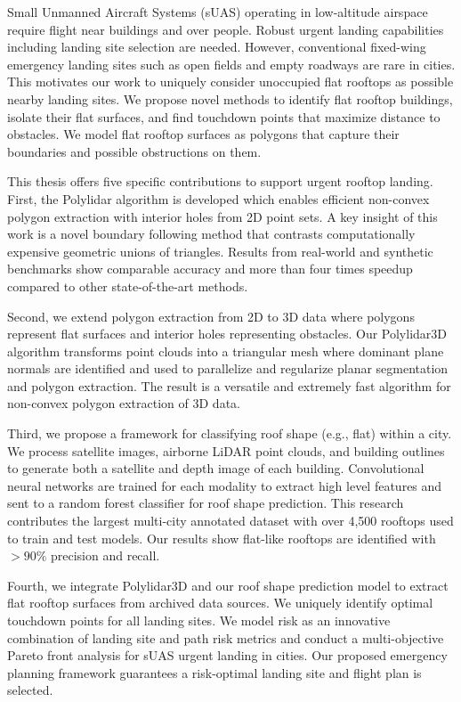Small Unmanned Aircraft Systems (sUAS) operating in low-altitude airspace require flight near buildings and over people. Robust urgent landing capabilities including landing site selection are needed. However, conventional fixed-wing emergency landing sites such as open fields and empty roadways are rare in cities. This motivates our work to uniquely consider unoccupied flat rooftops as possible nearby landing sites. We propose novel methods to identify flat rooftop buildings, isolate their flat surfaces, and find touchdown points that maximize distance to obstacles. We model flat rooftop surfaces as polygons that capture their boundaries and possible obstructions on them.

This thesis offers five specific contributions to support urgent rooftop landing. First, the Polylidar algorithm is developed which enables efficient non-convex polygon extraction with interior holes from 2D point sets.  A key insight of this work is a novel boundary following method that contrasts computationally expensive geometric unions of triangles. Results from real-world and synthetic benchmarks show comparable accuracy and more than four times speedup compared to other state-of-the-art methods. 

Second, we extend polygon extraction from 2D to 3D data where polygons represent flat surfaces and interior holes representing obstacles. Our Polylidar3D algorithm transforms point clouds into a triangular mesh where dominant plane normals are identified and used to parallelize and regularize planar segmentation and polygon extraction. The result is a versatile and extremely fast algorithm for non-convex polygon extraction of 3D data.

Third, we propose a framework for classifying roof shape (e.g., flat) within a city. We process satellite images, airborne LiDAR point clouds, and building outlines to generate both a satellite and depth image of each building. Convolutional neural networks are trained for each modality to extract high level features and sent to a random forest classifier for roof shape prediction. This research contributes the largest multi-city annotated dataset with over 4,500 rooftops used to train and test models. Our results show flat-like rooftops are identified with $> 90\%$ precision and recall. 

Fourth, we integrate Polylidar3D and our roof shape prediction model to extract flat rooftop surfaces from archived data sources. We uniquely identify optimal touchdown points for all landing sites. We model risk as an innovative combination of landing site and path risk metrics and conduct a multi-objective Pareto front analysis for sUAS urgent landing in cities. Our proposed emergency planning framework guarantees a risk-optimal landing site and flight plan is selected. 

